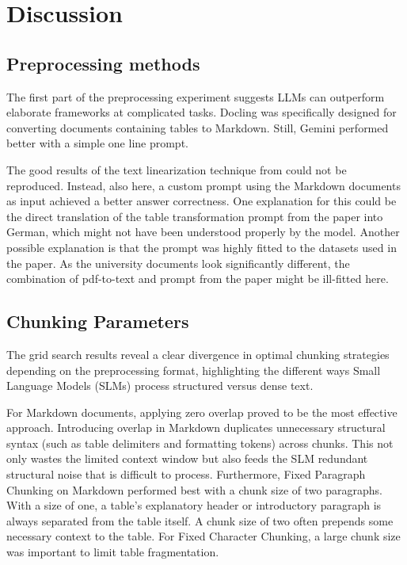 \documentclass[12pt]{article} %
\begin{document}
\FloatBarrier
\section{Discussion}
\subsection{Preprocessing methods}
The first part of the preprocessing experiment suggests LLMs can outperform elaborate frameworks at complicated tasks. Docling was specifically designed for converting documents containing tables to Markdown. Still, Gemini performed better with a simple one line prompt.

The good results of the text linearization technique from \textcite{min2024exploring} could not be reproduced. Instead, also here, a custom prompt using the Markdown documents as input achieved a better answer correctness. One explanation for this could be the direct translation of the table transformation prompt from the paper into German, which might not have been understood properly by the model. Another possible explanation is that the prompt was highly fitted to the datasets used in the paper. As the university documents look significantly different, the combination of pdf-to-text and prompt from the paper might be ill-fitted here.

\subsection{Chunking Parameters}
The grid search results reveal a clear divergence in optimal chunking strategies depending on the preprocessing format, highlighting the different ways Small Language Models (SLMs) process structured versus dense text.

For Markdown documents, applying zero overlap proved to be the most effective approach. Introducing overlap in Markdown duplicates unnecessary structural syntax (such as table delimiters and formatting tokens) across chunks. This not only wastes the limited context window but also feeds the SLM redundant structural noise that is difficult to process. Furthermore, Fixed Paragraph Chunking on Markdown performed best with a chunk size of two paragraphs. With a size of one, a table's explanatory header or introductory paragraph is always separated from the table itself. A chunk size of two often prepends some necessary context to the table. For Fixed Character Chunking, a large chunk size was important to limit table fragmentation.
\end{document}
